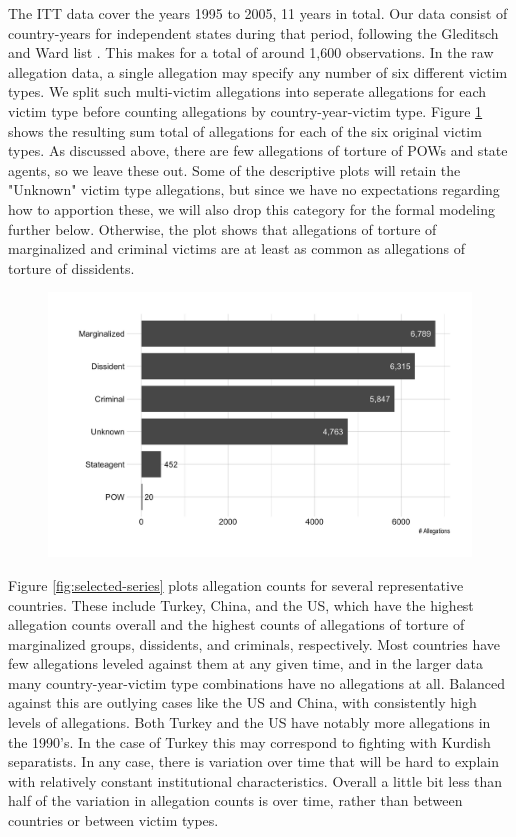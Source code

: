 \documentclass[12pt]{article}
\begin{document}
The ITT data cover the years 1995 to 2005, 11 years in total. Our data consist of country-years for independent states during that period, following the Gleditsch and Ward list \citep{gleditsch:ward:1999}. This makes for a total of around 1,600 observations. In the raw allegation data, a single allegation may specify any number of six different victim types. We split such multi-victim allegations into seperate allegations for each victim type before counting allegations by country-year-victim type. Figure \ref{fig:victim-types} shows the resulting sum total of allegations for each of the six original victim types. As discussed above, there are few allegations of torture of POWs and state agents, so we leave these out. Some of the descriptive plots will retain the "Unknown" victim type allegations, but since we have no expectations regarding how to apportion these, we will also drop this category for the formal modeling further below. Otherwise, the plot shows that allegations of torture of marginalized and criminal victims are at least as common as allegations of torture of dissidents. 

\begin{figure}
\begin{center}
\caption{}
\label{fig:victim-types}
\includegraphics[width=.5\textwidth]{../output/allegations-by-victim.png}
\end{center}
\end{figure}

Figure \ref{fig:selected-series} plots allegation counts for several representative countries. These include Turkey, China, and the US, which have the highest allegation counts overall and the highest counts of allegations of torture of marginalized groups, dissidents, and criminals, respectively. Most countries have few allegations leveled against them at any given time, and in the larger data many country-year-victim type combinations have no allegations at all. Balanced against this are outlying cases like the US and China, with consistently high levels of allegations. Both Turkey and the US have notably more allegations in the 1990's. In the case of Turkey this may correspond to fighting with Kurdish separatists. In any case, there is variation over time that will be hard to explain with relatively constant institutional characteristics. Overall a little bit less than half of the variation in allegation counts is over time, rather than between countries or between victim types. 
\end{document}
